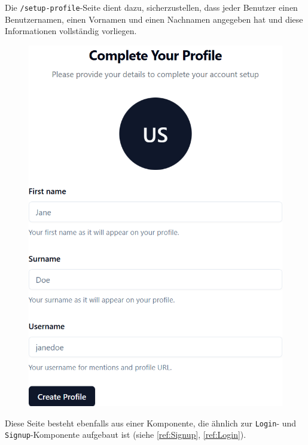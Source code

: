 \begin{inhalt}
\vspace{1cm}

Die \texttt{/setup-profile}-Seite dient dazu, sicherzustellen, dass jeder Benutzer einen Benutzernamen, einen Vornamen und einen Nachnamen angegeben hat und diese Informationen vollständig vorliegen.

\begin{figure}[!htb]
\centering
\includegraphics[width=1\textwidth]{files/Thomas/pics/Website/setup-profile/setup-profile.png}
\caption[Bildbezeichnung für Abbildungsverzeichnis]{}
\label{fig:gehaeuse_internet_bild}
\end{figure}

\clearpage

Diese Seite besteht ebenfalls aus einer Komponente, die ähnlich zur \texttt{Login}- und \texttt{Signup}-Komponente aufgebaut ist (siehe \ref{ref:Signup}, \ref{ref:Login}).


\end{inhalt}
